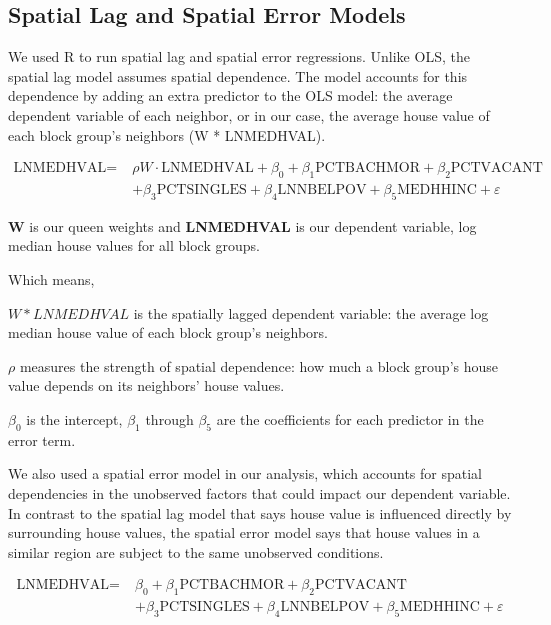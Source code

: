 \documentclass[
  12pt,
]{article}
\begin{document}
\subsection{Spatial Lag and Spatial Error
Models}\label{spatial-lag-and-spatial-error-models}

We used R to run spatial lag and spatial error regressions. Unlike OLS,
the spatial lag model assumes spatial dependence. The model accounts for
this dependence by adding an extra predictor to the OLS model: the
average dependent variable of each neighbor, or in our case, the average
house value of each block group's neighbors (W * LNMEDHVAL).

\[\begin{aligned}
\text{LNMEDHVAL} = \; & \rho W \cdot \text{LNMEDHVAL} + \beta_0 + \beta_1 \text{PCTBACHMOR} + \beta_2 \text{PCTVACANT} \\
& + \beta_3 \text{PCTSINGLES} + \beta_4 \text{LNNBELPOV} + \beta_5 \text{MEDHHINC} + \varepsilon
\end{aligned}\]

\textbf{W} is our queen weights and \textbf{LNMEDHVAL} is our dependent
variable, log median house values for all block groups.

Which means,

\(W * LNMEDHVAL\) is the spatially lagged dependent variable: the
average log median house value of each block group's neighbors.

\(\rho\) measures the strength of spatial dependence: how much a block
group's house value depends on its neighbors' house values.

\(\beta_0\) is the intercept, \(\beta_1\) through \(\beta_5\) are the
coefficients for each predictor in the error term.

We also used a spatial error model in our analysis, which accounts for
spatial dependencies in the unobserved factors that could impact our
dependent variable. In contrast to the spatial lag model that says house
value is influenced directly by surrounding house values, the spatial
error model says that house values in a similar region are subject to
the same unobserved conditions.

\[ \begin{aligned} \text{LNMEDHVAL} = \; & \beta_0 + \beta_1 \text{PCTBACHMOR} + \beta_2 \text{PCTVACANT} \\& + \beta_3 \text{PCTSINGLES} + \beta_4 \text{LNNBELPOV} + \beta_5 \text{MEDHHINC} + \varepsilon \end{aligned} \]
\end{document}
